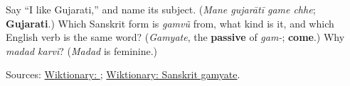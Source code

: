 \begin{tcolorbox}[breakable,colback=teal!4,colframe=teal!35!black,title={Before you move on}]
Say \textquotedblleft{}I like Gujarati,\textquotedblright{} and name its subject. (\emph{Mane gujarātī game chhe}; \textbf{Gujarati}.) Which Sanskrit form is \emph{gamvũ} from, what kind is it, and which English verb is the same word? (\emph{Gamyate}, the \textbf{passive} of \emph{gam-}; \textbf{come}.) Why \emph{madad karvī}? (\emph{Madad} is feminine.)

Sources: \href{https://en.wiktionary.org/wiki/\%E0\%AA\%97\%E0\%AA\%AE\%E0\%AA\%B5\%E0\%AB\%81\%E0\%AA\%82}{Wiktionary: }; \href{https://en.wiktionary.org/wiki/\%E0\%A4\%97\%E0\%A4\%AE\%E0\%A5\%8D\%E0\%A4\%AF\%E0\%A4\%A4\%E0\%A5\%87}{Wiktionary: Sanskrit gamyate}.
\end{tcolorbox}
